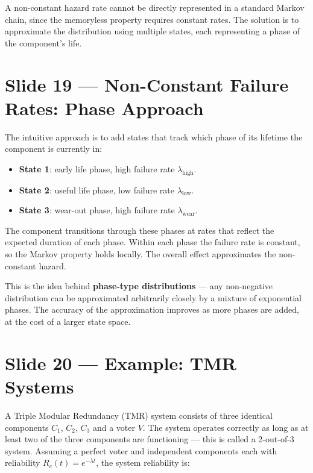 A non-constant hazard rate cannot be directly represented in a 
standard Markov chain, since the memoryless property requires 
constant rates. The solution is to approximate the distribution 
using multiple states, each representing a phase of the component's 
life.

\section*{Slide 19 — Non-Constant Failure Rates: Phase Approach}

The intuitive approach is to add states that track which phase of 
its lifetime the component is currently in:

\begin{itemize}
    \item \textbf{State 1}: early life phase, high failure rate 
    $\lambda_{\mathrm{high}}$.
    \item \textbf{State 2}: useful life phase, low failure rate 
    $\lambda_{\mathrm{low}}$.
    \item \textbf{State 3}: wear-out phase, high failure rate 
    $\lambda_{\mathrm{wear}}$.
\end{itemize}

The component transitions through these phases at rates that 
reflect the expected duration of each phase. Within each phase 
the failure rate is constant, so the Markov property holds locally. 
The overall effect approximates the non-constant hazard.

\begin{notebox}
    This is the idea behind \textbf{phase-type distributions} --- 
    any non-negative distribution can be approximated arbitrarily 
    closely by a mixture of exponential phases. The accuracy of 
    the approximation improves as more phases are added, at the 
    cost of a larger state space.
\end{notebox}

\section*{Slide 20 — Example: TMR Systems}

A Triple Modular Redundancy (TMR) system consists of three identical 
components $C_1$, $C_2$, $C_3$ and a voter $V$. The system operates 
correctly as long as at least two of the three components are 
functioning --- this is called a 2-out-of-3 system. Assuming a 
perfect voter and independent components each with reliability 
$R_c(t) = e^{-\lambda t}$, the system reliability is:

